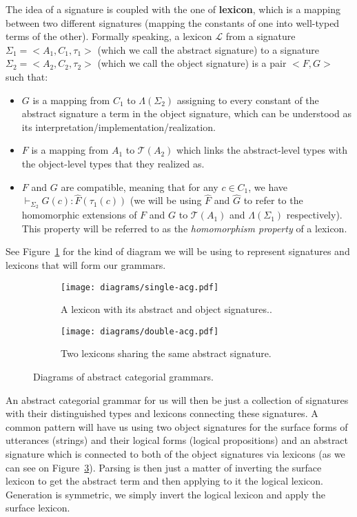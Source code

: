 The idea of a signature is coupled with the one of \textbf{lexicon},
which is a mapping between two different signatures (mapping the
constants of one into well-typed terms of the other). Formally speaking,
a lexicon $\mathcal{L}$ from a signature $\Sigma_1 = \mathopen{<}A_1,
C_1, \tau_1\mathclose{>}$ (which we call the abstract signature) to a
signature $\Sigma_2 = \mathopen{<}A_2, C_2, \tau_2\mathclose{>}$ (which
we call the object signature) is a pair $\mathopen{<}F, G\mathclose{>}$
such that:

\begin{itemize}
\item $G$ is a mapping from $C_1$ to $\Lambda(\Sigma_2)$ assigning to
  every constant of the abstract signature a term in the object
  signature, which can be understood as its
  interpretation/implementation/realization.
\item $F$ is a mapping from $A_1$ to $\mathcal{T}(A_2)$ which links the
  abstract-level types with the object-level types that they realized
  as.
\item $F$ and $G$ are compatible, meaning that for any $c \in C_1$, we
  have $\vdash_{\Sigma_2} G(c) : \hat{F}(\tau_1(c))$ (we will be using
  $\hat{F}$ and $\hat{G}$ to refer to the homomorphic extensions of $F$
  and $G$ to $\mathcal{T}(A_1)$ and $\Lambda(\Sigma_1)$
  respectively). This property will be referred to as the
  \emph{homomorphism property} of a lexicon.
\end{itemize}

See Figure~\ref{fig:single-acg} for the kind of diagram we will be using
to represent signatures and lexicons that will form our grammars.

\begin{figure}
  \centering
  \begin{subfigure}[b]{0.4\textwidth}
    \centering
    \texttt{[image: diagrams/single-acg.pdf]}
    \caption{{\label{fig:single-acg} A lexicon with its abstract
        and object signatures..}}
  \end{subfigure}
  \qquad
  \begin{subfigure}[b]{0.4\textwidth}
    \centering
    \texttt{[image: diagrams/double-acg.pdf]}
    \caption{{\label{fig:double-acg} Two lexicons sharing the same
        abstract signature.}}
  \end{subfigure}
  \caption{Diagrams of abstract categorial grammars.}
\end{figure}

An abstract categorial grammar for us will then be just a collection of
signatures with their distinguished types and lexicons connecting these
signatures. A common pattern will have us using two object signatures
for the surface forms of utterances (strings) and their logical forms
(logical propositions) and an abstract signature which is connected to
both of the object signatures via lexicons (as we can see on
Figure~\ref{fig:double-acg}). Parsing is then just a matter of inverting
the surface lexicon to get the abstract term and then applying to it the
logical lexicon. Generation is symmetric, we simply invert the logical
lexicon and apply the surface lexicon.

